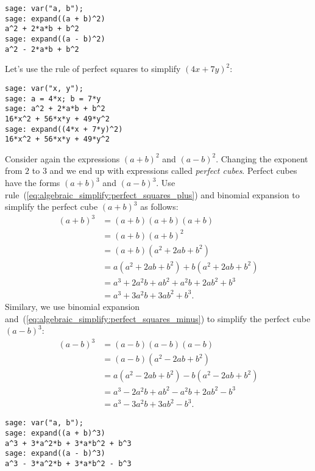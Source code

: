 \begin{lstlisting}
sage: var("a, b");
sage: expand((a + b)^2)
a^2 + 2*a*b + b^2
sage: expand((a - b)^2)
a^2 - 2*a*b + b^2
\end{lstlisting}

Let's use the rule of perfect squares to simplify $(4x + 7y)^2$:

\begin{lstlisting}
sage: var("x, y");
sage: a = 4*x; b = 7*y
sage: a^2 + 2*a*b + b^2
16*x^2 + 56*x*y + 49*y^2
sage: expand((4*x + 7*y)^2)
16*x^2 + 56*x*y + 49*y^2
\end{lstlisting}

Consider again the expressions $(a + b)^2$ and $(a - b)^2$. Changing
the exponent from $2$ to $3$ and we end up with expressions called
\emph{perfect cubes}. Perfect cubes have the
forms $(a + b)^3$ and $(a - b)^3$. Use
rule~(\ref{eq:algebraic_simplify:perfect_squares_plus}) and binomial
expansion to simplify the perfect cube $(a + b)^3$ as follows:
%
\begin{equation}
\label{eq:algebraic_simplify:perfect_cubes_plus}
\begin{aligned}
(a + b)^3
&=
(a + b)(a + b)(a + b) \\
&=
(a + b)(a + b)^2 \\
&=
(a + b)(a^2 + 2ab + b^2) \\
&=
a(a^2 + 2ab + b^2) + b(a^2 + 2ab + b^2) \\
&=
a^3 + 2a^2b + ab^2 + a^2b + 2ab^2 + b^3 \\
&=
a^3 + 3a^2b + 3ab^2 + b^3.
\end{aligned}
\end{equation}
%
Similary, we use binomial expansion
and~(\ref{eq:algebraic_simplify:perfect_squares_minus}) to simplify
the perfect cube $(a - b)^3$:
%
\begin{equation}
\label{eq:algebraic_simplify:perfect_cubes_minus}
\begin{aligned}
(a - b)^3
&=
(a - b)(a - b)(a - b) \\
&=
(a - b)(a^2 - 2ab + b^2) \\
&=
a(a^2 - 2ab + b^2) - b(a^2 - 2ab + b^2) \\
&=
a^3 - 2a^2b + ab^2 - a^2b + 2ab^2 - b^3 \\
&=
a^3 - 3a^2b + 3ab^2 - b^3.
\end{aligned}
\end{equation}

\begin{lstlisting}
sage: var("a, b");
sage: expand((a + b)^3)
a^3 + 3*a^2*b + 3*a*b^2 + b^3
sage: expand((a - b)^3)
a^3 - 3*a^2*b + 3*a*b^2 - b^3
\end{lstlisting}

